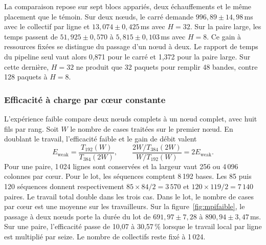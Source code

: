 La comparaison repose sur sept blocs appariés, deux échauffements et le même placement que le témoin. Sur deux nœuds, le carré demande \(996{,}89\pm14{,}98\)\,ms avec le collectif par ligne et \(13{,}074\pm0{,}425\)\,ms avec \(H=32\). Sur la paire large, les temps passent de \(51{,}925\pm0{,}570\) à \(5{,}815\pm0{,}103\)\,ms avec \(H=8\). Ce gain à ressources fixées se distingue du passage d'un nœud à deux. Le rapport de temps du pipeline seul vaut alors 0,871 pour le carré et 1,372 pour la paire large. Sur cette dernière, \(H=32\) ne produit que 32 paquets pour remplir 48 bandes, contre 128 paquets à \(H=8\).


\subsubsection{Efficacité à charge par cœur constante}
L'expérience faible compare deux nœuds complets à un nœud complet, avec huit fils par rang. Soit \(W\) le nombre de cases traitées sur le premier nœud. En doublant le travail, l'efficacité faible et le gain de débit valent
\[
 E_{\mathrm{weak}}=\frac{T_{192}(W)}{T_{384}(2W)},\qquad
 \frac{2W/T_{384}(2W)}{W/T_{192}(W)}=2E_{\mathrm{weak}}.
\]
Pour une paire, 1\,024 lignes sont conservées et la largeur vaut 256 ou 4\,096 colonnes par cœur. Pour le lot, les séquences comptent 8\,192 bases. Les 85 puis 120 séquences donnent respectivement \(85\times84/2=3\,570\) et \(120\times119/2=7\,140\) paires. Le travail total double dans les trois cas. Dans le lot, le nombre de cases par cœur est une moyenne sur les travailleurs.
Sur la figure~\ref{fig:mpifaible}, le passage à deux nœuds porte la durée du lot de \(691{,}97\pm7{,}28\) à \(890{,}94\pm3{,}47\)\,ms. Sur une paire, l'efficacité passe de 10,07 à 30,57\,\% lorsque le travail local par ligne est multiplié par seize. Le nombre de collectifs reste fixé à 1\,024.

\FloatBarrier
{}



